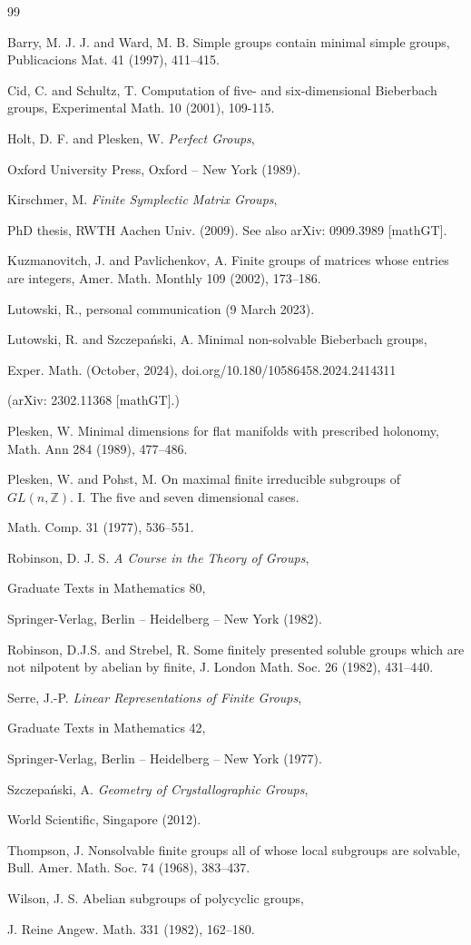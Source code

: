 \documentclass[12pt]{amsart}
\begin{document}
%
\newpage
\begin{thebibliography}{99}

 Barry, M. J. J. and Ward, M. B. 
Simple groups contain minimal simple groups,
Publicacions Mat. 41 (1997), 411--415.

 Cid, C. and Schultz, T. 
Computation of five- and six-dimensional Bieberbach groups,
Experimental Math. 10 (2001), 109-115.

 Holt, D. F.  and Plesken, W. 
\textit{Perfect Groups},

Oxford University Press, Oxford -- New York (1989).

 Kirschmer, M. 
\textit{Finite Symplectic Matrix Groups},

PhD thesis, RWTH Aachen Univ. (2009). See also arXiv: 0909.3989 [mathGT].

 Kuzmanovitch, J.  and Pavlichenkov, A. 
Finite groups of matrices whose entries are integers,
Amer. Math. Monthly 109 (2002), 173--186.

 Lutowski, R.,  personal communication (9 March 2023).

 Lutowski, R.  and Szczepa\'nski, A.  
Minimal non-solvable Bieberbach groups,

Exper. Math. (October, 2024),  doi.org/10.180/10586458.2024.2414311

(arXiv: 2302.11368 [mathGT].)

 Plesken, W.  Minimal dimensions for flat manifolds with prescribed holonomy,
Math. Ann 284 (1989), 477--486.

 Plesken, W. and Pohst, M.  
On maximal finite irreducible subgroups of $GL(n,\mathbb{Z})$.  I. 
The five and seven dimensional cases.

Math.  Comp. 31 (1977),  536--551.

 Robinson, D. J. S.  
\textit{A Course in the Theory of Groups},

Graduate Texts in Mathematics 80,

Springer-Verlag, Berlin -- Heidelberg -- New York (1982).

  Robinson, D.J.S. and Strebel,  R. 
Some finitely presented soluble groups which are not nilpotent by abelian by finite,
J. London Math. Soc. 26 (1982), 431--440.

 Serre, J.-P. 
\textit{Linear Representations of Finite Groups},

Graduate Texts in Mathematics 42,

Springer-Verlag, Berlin -- Heidelberg -- New York (1977).

 Szczepa\'nski, A.  
\textit{Geometry of Crystallographic Groups},

World Scientific, Singapore (2012).

Thompson, J.  
Nonsolvable finite groups all of whose local subgroups are solvable, 
Bull. Amer. Math. Soc. 74 (1968),  383--437.

Wilson, J.  S.  
Abelian subgroups of polycyclic groups, 

J. Reine Angew.  Math. 331 (1982), 162--180.

\end{thebibliography}
\end{document}
